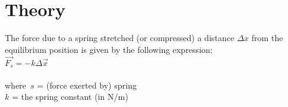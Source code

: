 \let\clearpage\relax\chapter{Theory}
\endgroup

The force due to a spring stretched (or compressed) a distance $\Delta x$ from the 
equilibrium position is given by the following expression:\\

$\vec{F_s} = -k\Delta \vec{x}$\\\\
\noindent where $\,s$ = (force exerted by) spring\\
\indent\indent $k$ = the spring constant (in N/m)
